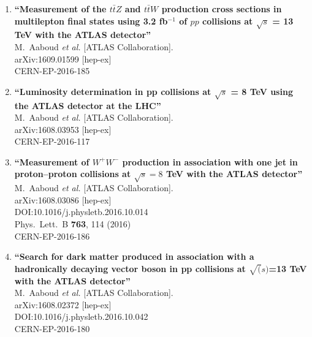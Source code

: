\documentclass{article}
\begin{document}
\begin{enumerate}
\item%
{\bf ``Measurement of the $t\bar{t}Z$ and $t\bar{t}W$ production cross sections in multilepton final states using 3.2 fb$^{-1}$ of $pp$ collisions at $\sqrt{s}$ = 13 TeV with the ATLAS detector''}
  \\{}M.~Aaboud {\it et al.} [ATLAS Collaboration].
  \\{}arXiv:1609.01599 [hep-ex]
  \\{}CERN-EP-2016-185

\item%
{\bf ``Luminosity determination in pp collisions at $\sqrt{s}$ = 8 TeV using the ATLAS detector at the LHC''}
  \\{}M.~Aaboud {\it et al.} [ATLAS Collaboration].
  \\{}arXiv:1608.03953 [hep-ex]
  \\{}CERN-EP-2016-117
\item%
{\bf ``Measurement of $W^+W^-$ production in association with one jet in proton--proton collisions at $\sqrt{s} =8$ TeV with the ATLAS detector''}
  \\{}M.~Aaboud {\it et al.} [ATLAS Collaboration].
  \\{}arXiv:1608.03086 [hep-ex]
  \\{}DOI:10.1016/j.physletb.2016.10.014
  \\{}Phys.\ Lett.\ B {\bf 763}, 114 (2016)
  \\{}CERN-EP-2016-186
\item%
{\bf ``Search for dark matter produced in association with a hadronically decaying vector boson in pp collisions at $\sqrt(s)$=13 TeV with the ATLAS detector''}
  \\{}M.~Aaboud {\it et al.} [ATLAS Collaboration].
  \\{}arXiv:1608.02372 [hep-ex]
  \\{}DOI:10.1016/j.physletb.2016.10.042
  \\{}CERN-EP-2016-180

\end{enumerate}
\end{document}
